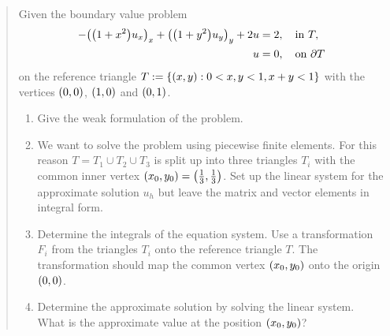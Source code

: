 \documentclass[english]{exercise}
\begin{document}
    \begin{quote}
        Given the boundary value problem
        \begin{align*}
            -\parentheses*{\parentheses*{1 + x^2}u_x}_x + \parentheses*{\parentheses*{1 + y^2}u_y}_y + 2u &= 2, \quad \text{in }T,\\
            u & =0, \quad \text{on }\partial T
        \end{align*}
        on the reference triangle \(T := \braces*{\parentheses*{x, y} : 0 < x, y < 1, x + y < 1}\) with the vertices \(\parentheses*{0, 0}\), \(\parentheses*{1, 0}\) and \(\parentheses*{0, 1}\).
        \begin{enumerate}
            \item Give the weak formulation of the problem.
            \item We want to solve the problem using piecewise finite elements.
            For this reason \(T = T_1 \cup T_2 \cup T_3\) is split up into three triangles \(T_i\) with the common inner vertex \(\parentheses*{x_0, y_0} = \parentheses*{\frac{1}{3}, \frac{1}{3}}\).
            Set up the linear system for the approximate solution \(u_h\) but leave the matrix and vector elements in integral form.
            \item Determine the integrals of the equation system.
            Use a transformation \(F_i\) from the triangles \(T_i\) onto the reference triangle \(T\).
            The transformation should map the common vertex \(\parentheses*{x_0, y_0}\) onto the origin \(\parentheses*{0, 0}\).
            \item Determine the approximate solution by solving the linear system.
            What is the approximate value at the position \(\parentheses*{x_0, y_0}\)?
        \end{enumerate}
    \end{quote}
    
\end{document}
